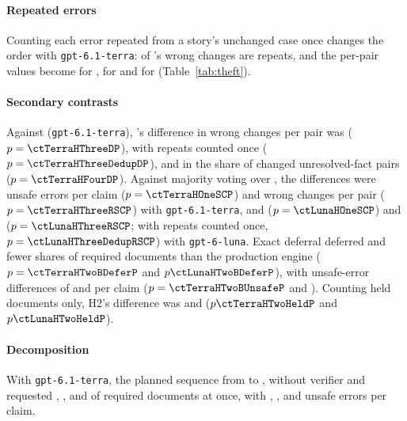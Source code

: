 \paragraph{Repeated errors}
Counting each error repeated from a story's unchanged case once changes the order with \texttt{gpt-6.1-terra}: \thTerraDWrongInShared{} of 's \thTerraDWrong{} wrong changes are repeats, and the per-pair values become \thTerraDDedupWrongPP{} for , \thTerraRDedupWrongPP{} for  and \thTerraCPDedupWrongPP{} for \casepath (Table~\ref{tab:theft}).

\paragraph{Secondary contrasts}
Against  (\texttt{gpt-6.1-terra}), \casepath's difference in wrong changes per pair was \ctTerraHThreeDDiff{} ($p=\ctTerraHThreeDP$), \ctTerraHThreeDedupDDiff{} with repeats counted once ($p=\ctTerraHThreeDedupDP$), and in the share of changed unresolved-fact pairs \ctTerraHFourDDiff{} ($p=\ctTerraHFourDP$). Against majority voting over , the differences were \ctTerraHOneSCDiff{} unsafe errors per claim ($p=\ctTerraHOneSCP$) and \ctTerraHThreeRSCDiff{} wrong changes per pair ($p=\ctTerraHThreeRSCP$) with \texttt{gpt-6.1-terra}, and \ctLunaHOneSCDiff{} ($p=\ctLunaHOneSCP$) and \ctLunaHThreeRSCDiff{} ($p=\ctLunaHThreeRSCP$; \ctLunaHThreeDedupRSCDiff{} with repeats counted once, $p=\ctLunaHThreeDedupRSCP$) with \texttt{gpt-6-luna}. Exact deferral deferred \ctTerraHTwoBDeferDiff{} and \ctLunaHTwoBDeferDiff{} fewer shares of required documents than the production engine ($p=\ctTerraHTwoBDeferP$ and $p\ctLunaHTwoBDeferP$), with unsafe-error differences of \ctTerraHTwoBUnsafeDiff{} and \ctLunaHTwoBUnsafeDiff{} per claim ($p=\ctTerraHTwoBUnsafeP$ and \ctLunaHTwoBUnsafeP). Counting held documents only, H2's difference was \ctTerraHTwoHeldDiff{} and \ctLunaHTwoHeldDiff{} ($p\ctTerraHTwoHeldP$ and $p\ctLunaHTwoHeldP$).

\paragraph{Decomposition}
With \texttt{gpt-6.1-terra}, the planned sequence from  to , \casepath without verifier and \casepath requested \pct{\tenTerraBoneRecall}, \pct{\tenTerraBtwoRecall}, \pct{\tenTerraCPxnRecall} and \pct{\tenTerraCPxRecall} of required documents at once, with \tenTerraBoneUnsafe, \tenTerraBtwoUnsafe, \tenTerraCPxnUnsafe{} and \tenTerraCPxUnsafe{} unsafe errors per claim.

